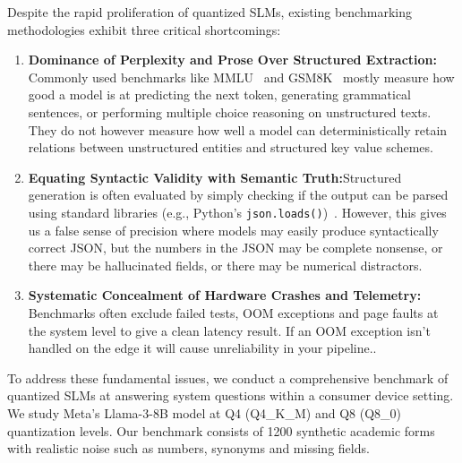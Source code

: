 \documentclass[conference]{IEEEtran}
\begin{document}
Despite the rapid proliferation of quantized SLMs, existing benchmarking methodologies exhibit three critical shortcomings:
\begin{enumerate}
    \item \textbf{Dominance of Perplexity and Prose Over Structured Extraction:} Commonly used benchmarks like MMLU~\cite{hendrycks2021measuring} and GSM8K~\cite{cobbe2021gsm8k} mostly measure how good a model is at predicting the next token, generating grammatical sentences, or performing multiple choice reasoning on unstructured texts. They do not however measure how well a model can deterministically retain relations between unstructured entities and structured key value schemes.
    \item \textbf{Equating Syntactic Validity with Semantic Truth:}Structured generation is often evaluated by simply checking if the output can be parsed using standard libraries (e.g., Python's \texttt{json.loads()})~\cite{willard2023outlines,zheng2024sglang}. However, this gives us a false sense of precision where models may easily produce syntactically correct JSON, but the numbers in the JSON may be complete nonsense, or there may be hallucinated fields, or there may be numerical distractors.
    \item \textbf{Systematic Concealment of Hardware Crashes and Telemetry:} Benchmarks often exclude failed tests, OOM exceptions and page faults at the system level to give a clean latency result. If an OOM exception isn't handled on the edge it will cause unreliability in your pipeline..
\end{enumerate}

To address these fundamental issues, we conduct a comprehensive benchmark of quantized SLMs at answering system questions within a consumer device setting. We study Meta's Llama-3-8B model at Q4 (Q4\_K\_M) and Q8 (Q8\_0) quantization levels. Our benchmark consists of 1200 synthetic academic forms with realistic noise such as numbers, synonyms and missing fields. 
\end{document}
